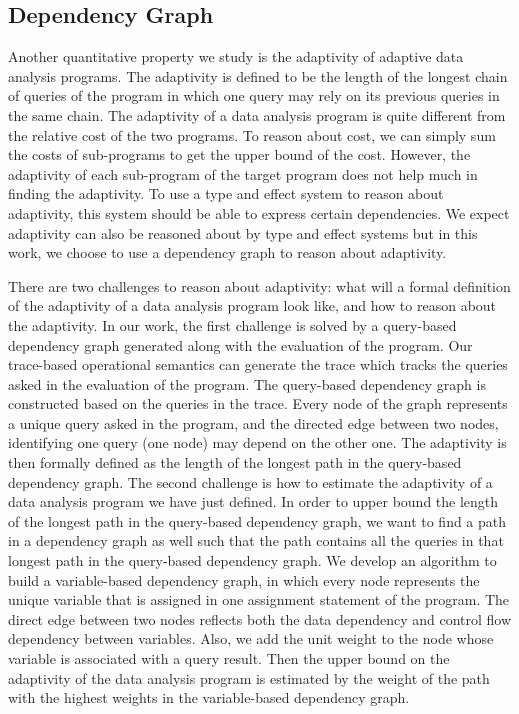 \subsection{Dependency Graph}
Another quantitative property we study is the adaptivity of adaptive data analysis programs. 
{The adaptivity is defined to be the length of the longest chain of queries of the program in which one query may rely 
on its previous queries in the same chain. 
The adaptivity of a data analysis program is quite different from the relative cost of the two programs. To reason about cost, we can simply sum the costs of sub-programs to get the upper bound of the cost. However, the adaptivity of each sub-program of the target program does not help much in finding the adaptivity. To use a type and effect system to reason about adaptivity, this system should be able to express certain dependencies.
We expect adaptivity can also be reasoned about by type and effect systems but in this work, we choose to use a dependency graph to reason about adaptivity.}

{There are two challenges to reason about adaptivity: what will a formal definition of the adaptivity of a data analysis program look like, and how to reason about the adaptivity. 
In our work, the first challenge is solved by a query-based dependency graph generated along with the evaluation of the program. 
Our trace-based operational semantics can generate the trace which tracks the queries asked in the evaluation of the program. 
The query-based dependency graph is constructed based on the queries in the trace. Every node of the graph represents a unique query asked in the program, and the directed edge between two nodes, identifying one query (one node) may depend on the other one. 
The adaptivity is then formally defined as the length of the longest path in the query-based dependency graph.}
{The second challenge is how to estimate the adaptivity of a data analysis program we have just defined. 
In order to upper bound the length of the longest path in the query-based dependency graph, we want to find a path in a dependency graph as well such that the path contains all the queries in that longest path in the query-based dependency graph. 
We develop an algorithm to build a variable-based dependency graph, in which every node represents the unique variable that is assigned in one assignment statement of the program. 
The direct edge between two nodes reflects both the data dependency and control flow dependency between variables. Also, we add the unit weight to the node whose variable is associated with a query result. Then the upper bound on the adaptivity of the data analysis program is estimated by the weight of the path with the highest weights in the variable-based dependency graph.}

